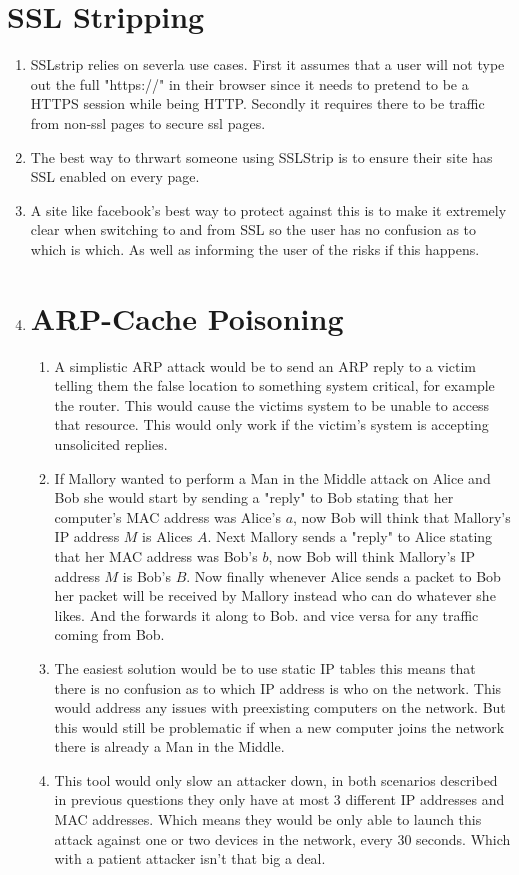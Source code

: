 \documentclass{article}
\begin{document}
\section{SSL Stripping}
\begin{enumerate}[A]
	\item SSLstrip relies on severla use cases. First it assumes that a user will
		not type out the full "https://" in their browser since it needs to
		pretend to be a HTTPS session while being HTTP. Secondly it requires
		there to be traffic from non-ssl pages to secure ssl pages. 
	\item The best way to thrwart someone using SSLStrip is to ensure their site
		has SSL enabled on every page.
	\item A site like facebook's best way to protect against this is to make it
		extremely clear when switching to and from SSL so the user has no
		confusion as to which is which. As well as informing the user of the
		risks if this happens.
	\item %
\section{ARP-Cache Poisoning}
\begin{enumerate}[A]
	\item A simplistic ARP attack would be to send an ARP reply to a victim
		telling them the false location to something system critical, for
		example the router. This would cause the victims system to be unable to
		access that resource. This would only work if the victim's system is
		accepting unsolicited replies.
	\item If Mallory wanted to perform a Man in the Middle attack on Alice and
		Bob she would start by sending a "reply" to Bob stating that her
		computer's MAC address was Alice's $a$, now Bob will think that
		Mallory's IP address $M$ is Alices $A$. Next Mallory sends a "reply" to
		Alice stating that her MAC address was Bob's $b$, now Bob will think
		Mallory's IP address $M$ is Bob's $B$. Now finally whenever
		Alice sends a packet to Bob her packet will be received by Mallory
		instead who can do whatever she likes. And the forwards it along to Bob.
		and vice versa for any traffic coming from Bob.
	\item The easiest solution would be to use static IP tables this means that
		there is no confusion as to which IP address is who on the network. This
		would address any issues with preexisting computers on the network. But
		this would still be problematic if when a new computer joins the network
		there is already a Man in the Middle.
	\item This tool would only slow an attacker down, in both scenarios
		described in previous questions they only have at most 3 different IP
		addresses and MAC addresses. Which means they would be only able to
		launch this attack against one or two devices in the network, every 30
		seconds. Which with a patient attacker isn't that big a deal.
\end{enumerate}

\end{enumerate}
\end{document}
